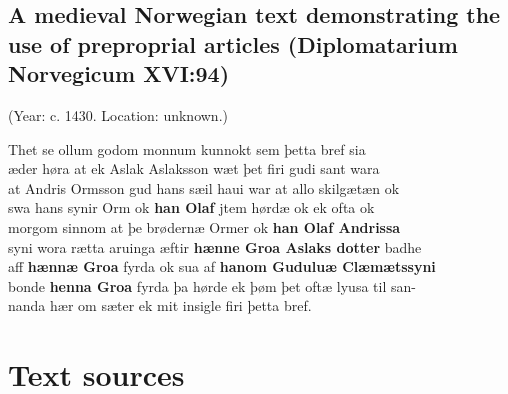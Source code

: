 \section{\rmfamily\bfseries A medieval Norwegian text demonstrating the use of preproprial articles (Diplomatarium Norvegicum XVI:94)}

 (Year: c. 1430. Location: unknown.)

Thet se ollum godom monnum kunnokt sem þetta bref sia\\
æder høra at ek Aslak Aslaksson wæt þet firi gudi sant wara\\
at Andris Ormsson gud hans sæil haui war at allo skilgætæn ok\\
swa hans synir Orm ok \textbf{han Olaf} jtem hørdæ ok ek ofta ok\\
morgom sinnom at þe brødernæ Ormer ok \textbf{han Olaf Andrissa}\\
syni wora rætta aruinga æftir \textbf{hænne Groa Aslaks dotter} badhe\\
aff \textbf{hænnæ Groa} fyrda ok sua af \textbf{hanom Guduluæ Clæmætssyni}\\
bonde \textbf{henna Groa} fyrda þa hørde ek þøm þet oftæ lyusa til san-\\
nanda hær om sæter ek mit insigle firi þetta bref.

\chapter[Text sources]{\rmfamily\bfseries Text sources}


